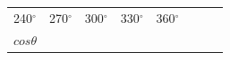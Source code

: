 \begin{center}
\begin{xtabular*}{\mytablewidth}[t]{|p{10\mystarwidth}|p{10\mystarwidth}|p{10\mystarwidth}|p{10\mystarwidth}|p{10\mystarwidth}|p{10\mystarwidth}|p{10\mystarwidth}|p{10\mystarwidth}|}
    
        240\begin{math}{}^{\circ }\end{math} &
    
    
        270\begin{math}{}^{\circ }\end{math} &
    
    
        300\begin{math}{}^{\circ }\end{math} &
    
    
        330\begin{math}{}^{\circ }\end{math} &
    
    
        360\begin{math}{}^{\circ }\end{math}%
     \tabularnewline{}
    
    
        
                  \begin{math}cos\theta \end{math}
                 &
    

\end{xtabular*}
\end{center}

